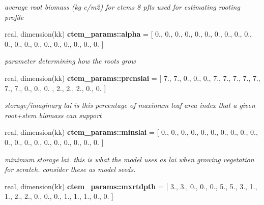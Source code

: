 \begin{DoxyCompactItemize}
\begin{DoxyCompactList}\small\item\em average root biomass (kg c/m2) for ctem\textquotesingle{}s 8 pfts used for estimating rooting profile \end{DoxyCompactList}\item 
\hypertarget{namespacectem__params_aafa01f9ec060f116fdd559e2f9c8b32e}{}real, dimension(kk) {\bfseries ctem\+\_\+params\+::alpha} = \mbox{[} 0., 0., 0., 0., 0., 0., 0., 0., 0., 0., 0., 0., 0., 0., 0., 0., 0., 0., 0., 0. \mbox{]}\label{namespacectem__params_aafa01f9ec060f116fdd559e2f9c8b32e}

\begin{DoxyCompactList}\small\item\em parameter determining how the roots grow \end{DoxyCompactList}\item 
\hypertarget{namespacectem__params_a2bc170a6ee30f73dba8ce44297493550}{}real, dimension(kk) {\bfseries ctem\+\_\+params\+::prcnslai} = \mbox{[} 7., 7., 0., 0., 0., 7., 7., 7., 7., 7., 7., 7., 0., 0., 0. , 2., 2., 2., 0., 0. \mbox{]}\label{namespacectem__params_a2bc170a6ee30f73dba8ce44297493550}

\begin{DoxyCompactList}\small\item\em storage/imaginary lai is this percentage of maximum leaf area index that a given root+stem biomass can support \end{DoxyCompactList}\item 
\hypertarget{namespacectem__params_af7fddd21a0baea756dfde3683a67ec83}{}real, dimension(kk) {\bfseries ctem\+\_\+params\+::minslai} = \mbox{[} 0., 0., 0., 0., 0., 0., 0., 0., 0., 0., 0., 0., 0., 0., 0., 0., 0., 0., 0., 0. \mbox{]}\label{namespacectem__params_af7fddd21a0baea756dfde3683a67ec83}

\begin{DoxyCompactList}\small\item\em minimum storage lai. this is what the model uses as lai when growing vegetation for scratch. consider these as model seeds. \end{DoxyCompactList}\item 
\hypertarget{namespacectem__params_aa04ff0cae9a12857edb2bced344e57eb}{}real, dimension(kk) {\bfseries ctem\+\_\+params\+::mxrtdpth} = \mbox{[} 3., 3., 0., 0., 0., 5., 5., 3., 1., 1., 2., 2., 0., 0., 0., 1., 1., 1., 0., 0. \mbox{]}\label{namespacectem__params_aa04ff0cae9a12857edb2bced344e57eb}


\end{DoxyCompactItemize}
